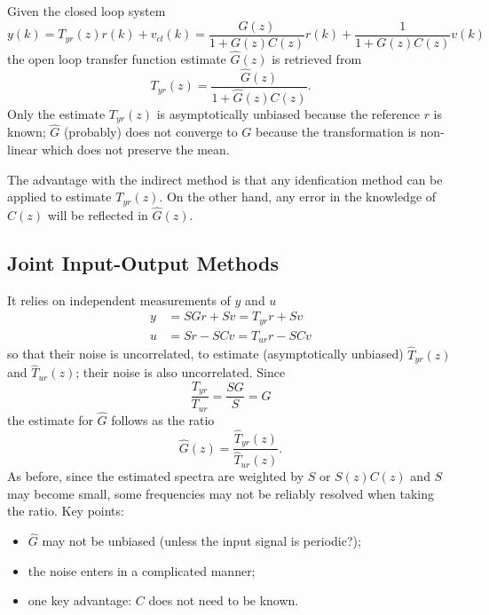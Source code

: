 Given the closed loop system
\begin{equation*}
  y(k) = T_{yr}(z)r(k) + v_{cl}(k) = \frac{G(z)}{1+G(z)C(z)}r(k) + \frac{1}{1+G(z)C(z)}v(k)
\end{equation*}
the open loop transfer function estimate $\hat{G}(z)$ is retrieved from
\begin{equation*}
  T_{yr}(z) = \frac{\hat{G}(z)}{1+\hat{G}(z)C(z)}.
\end{equation*}
Only the estimate $T_{yr}(z)$ is asymptotically unbiased because the reference $r$ is known; $\hat{G}$ (probably) does not converge to $G$ because the transformation is non-linear which does not preserve the mean.

The advantage with the indirect method is that any idenfication method can be applied to estimate $T_{yr}(z)$. On the other hand, any error in the knowledge of $C(z)$ will be reflected in $\hat{G}(z)$.

\subsection{Joint Input-Output Methods}
\label{sec:joint-input-output-methods}

It relies on independent measurements of $y$ and $u$
\begin{equation*}
  \begin{aligned}
    y &= SGr + Sv = T_{yr}r + Sv \\
    u &= Sr - SCv = T_{ur}r - SCv
  \end{aligned}
\end{equation*}
so that their noise is uncorrelated, to estimate (asymptotically unbiased) $\hat{T}_{yr}(z)$ and $\hat{T}_{ur}(z)$; their noise is also uncorrelated. Since
\begin{equation*}
  \frac{T_{yr}}{T_{ur}} = \frac{SG}{S} = G
\end{equation*}
the estimate for $\hat{G}$ follows as the ratio
\begin{equation*}
  \hat{G}(z) = \frac{\hat{T}_{yr}(z)}{\hat{T}_{ur}(z)}.
\end{equation*}
As before, since the estimated spectra are weighted by $S$ or $S(z)C(z)$ and $S$ may become small, some frequencies may not be reliably resolved when taking the ratio. Key points:
\begin{itemize}
\item $\hat{G}$ may not be unbiased (unless the input signal is periodic?);
\item the noise enters in a complicated manner;
\item one key advantage: $C$ does not need to be known.
\end{itemize}

